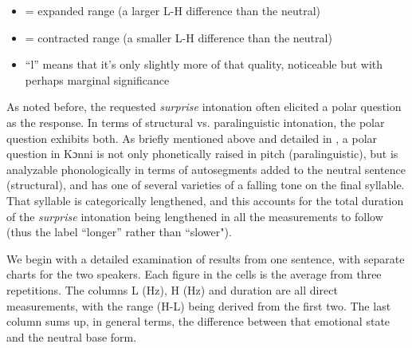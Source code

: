 \documentclass[output=paper]{langsci/langscibook}
\begin{document}
\begin{itemize}
\item \EXP = expanded range (a larger L-H difference than the neutral)
\item \CONT = contracted range (a smaller L-H difference than the neutral)
\item ``l'' means that it's only slightly more of that quality, noticeable but with perhaps marginal significance 
\end{itemize}

As noted before, the requested \emph{surprise} intonation often elicited a polar question as the response. In terms of structural vs. paralinguistic intonation, the polar question exhibits both. As briefly mentioned above and detailed in \citet{cahill2012}, a polar question in Kɔnni is not only phonetically raised in pitch (paralinguistic), but is analyzable phonologically in terms of autosegments added to the neutral sentence (structural), and has one of several varieties of a falling tone on the final syllable. That syllable is categorically lengthened, and this accounts for the total duration of the \emph{surprise} intonation being lengthened in all the measurements to follow (thus the label ``longer'' rather than ``slower").



We begin with a detailed examination of results from one sentence, with separate charts for the two speakers. Each figure in the cells is the average from three repetitions. The columns L (Hz), H (Hz) and duration are all direct measurements, with the range (H-L) being derived from the first two. The last column sums up, in general terms, the difference between that emotional state and the neutral base form. 




\begin{table}

\caption{`S/he has cooked yams' \emph{ù dìgìwó nyʊ́à} (Solomon)}
\label{tab:3.cahill}

\end{table}
\end{document}
